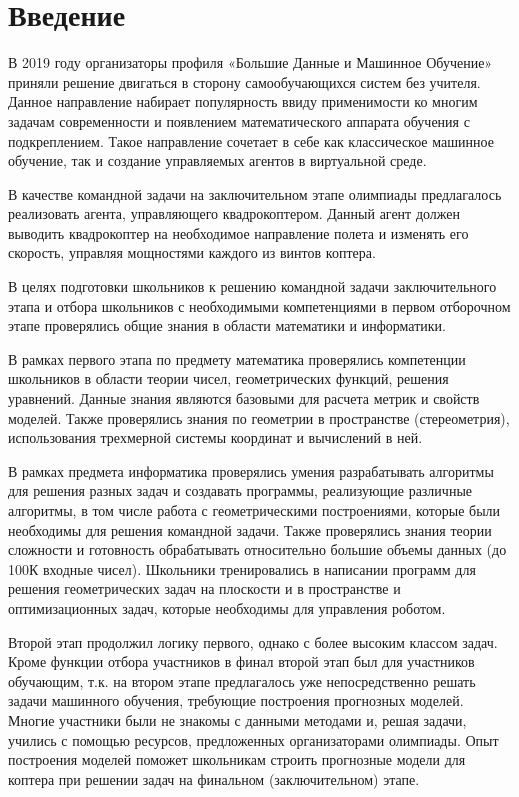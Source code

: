%
\begingroup
\pagestyle{empty}

\section*{Введение}

В 2019 году организаторы профиля «Большие Данные и Машинное Обучение»  приняли решение двигаться в сторону самообучающихся систем без учителя. Данное направление набирает популярность ввиду применимости ко многим задачам современности и появлением математического аппарата обучения с подкреплением. Такое направление сочетает в себе как классическое машинное обучение, так и создание управляемых агентов в виртуальной среде. 

В качестве командной задачи на заключительном этапе олимпиады предлагалось реализовать агента, управляющего квадрокоптером. Данный агент должен выводить квадрокоптер на необходимое направление полета и изменять его скорость, управляя мощностями каждого из винтов коптера.

В целях подготовки школьников к решению командной задачи заключительного этапа и отбора школьников с необходимыми компетенциями в первом отборочном этапе проверялись общие знания в области математики и информатики.

В рамках первого этапа по предмету математика проверялись компетенции школьников в области теории чисел, геометрических функций, решения уравнений. Данные знания являются базовыми для расчета метрик и свойств моделей. Также проверялись знания по геометрии в пространстве (стереометрия), использования трехмерной системы координат и вычислений в ней.  

В рамках предмета информатика проверялись умения разрабатывать алгоритмы для решения разных задач и создавать программы, реализующие различные алгоритмы, в том числе работа с геометрическими построениями, которые были необходимы для решения командной задачи. Также проверялись знания теории сложности и готовность обрабатывать относительно большие объемы данных (до 100К входные чисел). Школьники тренировались в написании программ для решения геометрических задач на плоскости и в пространстве и оптимизационных задач, которые необходимы для управления роботом.

Второй этап продолжил логику первого, однако с более высоким классом задач. Кроме функции отбора участников в финал второй этап был для участников обучающим, т.к. на втором этапе предлагалось уже непосредственно решать задачи машинного обучения, требующие построения прогнозных моделей. Многие участники были не знакомы с данными методами и, решая задачи, учились с помощью ресурсов, предложенных организаторами олимпиады.  Опыт построения моделей поможет школьникам строить прогнозные модели для коптера при решении задач на финальном (заключительном) этапе.

